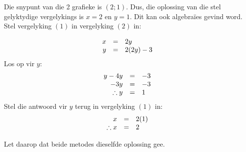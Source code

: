 Die snypunt van die 2 grafieke is $(2;1)$. Dus, die oplossing van die stel gelyktydige vergelykings is $x=2$ en $y=1$.
Dit kan ook algebraïes gevind word. 
Stel vergelyking $(1)$ in vergelyking $(2)$ in:

\begin{equation*}
\begin{array}{ccl}\hfill x& =& 2y\hfill \\
 \hfill y& =& 2(2y)-3\hfill 
\end{array}
\end{equation*}
Los op vir $y$:
\begin{equation*}
\begin{array}{ccl}
 \hfill y-4y& =& -3\hfill \\
 \hfill -3y& =& -3\hfill \\ 
\hfill \therefore y& =& 1\hfill 
\end{array}
\end{equation*}
Stel die antwoord vir $y$ terug in vergelyking $(1)$ in:
\begin{equation*}
\begin{array}{ccl}
 \hfill x& =& 2(1)\hfill \\
 \therefore x&=& 2\hfill \end{array}
\end{equation*}

Let daarop dat beide metodes dieselfde oplossing gee.

